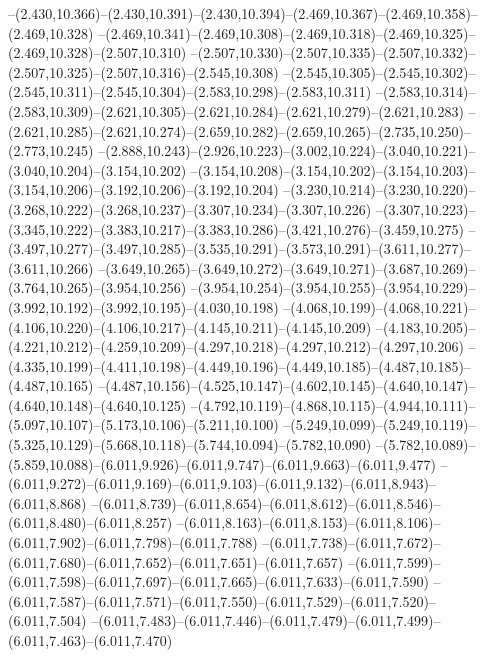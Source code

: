   --(2.430,10.366)--(2.430,10.391)--(2.430,10.394)--(2.469,10.367)--(2.469,10.358)--(2.469,10.328)%
  --(2.469,10.341)--(2.469,10.308)--(2.469,10.318)--(2.469,10.325)--(2.469,10.328)--(2.507,10.310)%
  --(2.507,10.330)--(2.507,10.335)--(2.507,10.332)--(2.507,10.325)--(2.507,10.316)--(2.545,10.308)%
  --(2.545,10.305)--(2.545,10.302)--(2.545,10.311)--(2.545,10.304)--(2.583,10.298)--(2.583,10.311)%
  --(2.583,10.314)--(2.583,10.309)--(2.621,10.305)--(2.621,10.284)--(2.621,10.279)--(2.621,10.283)%
  --(2.621,10.285)--(2.621,10.274)--(2.659,10.282)--(2.659,10.265)--(2.735,10.250)--(2.773,10.245)%
  --(2.888,10.243)--(2.926,10.223)--(3.002,10.224)--(3.040,10.221)--(3.040,10.204)--(3.154,10.202)%
  --(3.154,10.208)--(3.154,10.202)--(3.154,10.203)--(3.154,10.206)--(3.192,10.206)--(3.192,10.204)%
  --(3.230,10.214)--(3.230,10.220)--(3.268,10.222)--(3.268,10.237)--(3.307,10.234)--(3.307,10.226)%
  --(3.307,10.223)--(3.345,10.222)--(3.383,10.217)--(3.383,10.286)--(3.421,10.276)--(3.459,10.275)%
  --(3.497,10.277)--(3.497,10.285)--(3.535,10.291)--(3.573,10.291)--(3.611,10.277)--(3.611,10.266)%
  --(3.649,10.265)--(3.649,10.272)--(3.649,10.271)--(3.687,10.269)--(3.764,10.265)--(3.954,10.256)%
  --(3.954,10.254)--(3.954,10.255)--(3.954,10.229)--(3.992,10.192)--(3.992,10.195)--(4.030,10.198)%
  --(4.068,10.199)--(4.068,10.221)--(4.106,10.220)--(4.106,10.217)--(4.145,10.211)--(4.145,10.209)%
  --(4.183,10.205)--(4.221,10.212)--(4.259,10.209)--(4.297,10.218)--(4.297,10.212)--(4.297,10.206)%
  --(4.335,10.199)--(4.411,10.198)--(4.449,10.196)--(4.449,10.185)--(4.487,10.185)--(4.487,10.165)%
  --(4.487,10.156)--(4.525,10.147)--(4.602,10.145)--(4.640,10.147)--(4.640,10.148)--(4.640,10.125)%
  --(4.792,10.119)--(4.868,10.115)--(4.944,10.111)--(5.097,10.107)--(5.173,10.106)--(5.211,10.100)%
  --(5.249,10.099)--(5.249,10.119)--(5.325,10.129)--(5.668,10.118)--(5.744,10.094)--(5.782,10.090)%
  --(5.782,10.089)--(5.859,10.088)--(6.011,9.926)--(6.011,9.747)--(6.011,9.663)--(6.011,9.477)%
  --(6.011,9.272)--(6.011,9.169)--(6.011,9.103)--(6.011,9.132)--(6.011,8.943)--(6.011,8.868)%
  --(6.011,8.739)--(6.011,8.654)--(6.011,8.612)--(6.011,8.546)--(6.011,8.480)--(6.011,8.257)%
  --(6.011,8.163)--(6.011,8.153)--(6.011,8.106)--(6.011,7.902)--(6.011,7.798)--(6.011,7.788)%
  --(6.011,7.738)--(6.011,7.672)--(6.011,7.680)--(6.011,7.652)--(6.011,7.651)--(6.011,7.657)%
  --(6.011,7.599)--(6.011,7.598)--(6.011,7.697)--(6.011,7.665)--(6.011,7.633)--(6.011,7.590)%
  --(6.011,7.587)--(6.011,7.571)--(6.011,7.550)--(6.011,7.529)--(6.011,7.520)--(6.011,7.504)%
  --(6.011,7.483)--(6.011,7.446)--(6.011,7.479)--(6.011,7.499)--(6.011,7.463)--(6.011,7.470)%
